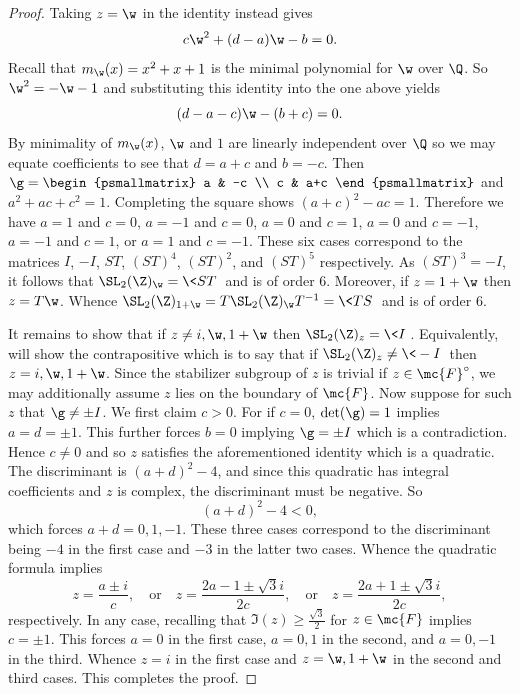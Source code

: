 \documentclass[12pt]{article}
\begin{document}
\begin{proof}
        Taking \(z = \w\) in the identity instead gives
        \[
          c\w^{2}+(d-a)\w-b = 0.
        \]
        Recall that \(m_{\w}(x) = x^{2}+x+1\) is the minimal polynomial for \(\w\) over \(\Q\). So \(\w^{2} = -\w-1\) and substituting this identity into the one above yields
        \[
        (d-a-c)\w-(b+c) = 0.
        \]
        By minimality of \(m_{\w}(x)\), \(\w\) and \(1\) are linearly independent over \(\Q\) so we may equate coefficients to see that \(d = a+c\) and \(b = -c\). Then \(\g = \begin{psmallmatrix} a & -c \\ c & a+c \end{psmallmatrix}\) and \(a^{2}+ac+c^{2} = 1\). Completing the square shows \((a+c)^{2}-ac = 1\). Therefore we have \(a = 1\) and \(c = 0\), \(a = -1\) and \(c = 0\), \(a = 0\) and \(c = 1\), \(a = 0\) and \(c = -1\), \(a = -1\) and \(c = 1\), or \(a = 1\) and \(c = -1\). These six cases correspond to the matrices \(I\), \(-I\), \(ST\), \((ST)^{4}\), \((ST)^{2}\), and \((ST)^{5}\) respectively. As \((ST)^{3} = -I\), it follows that \(\SL_{2}(\Z)_{\w} = \<ST\>\) and is of order \(6\). Moreover, if \(z = 1+\w\) then \(z = T\w\). Whence \(\SL_{2}(\Z)_{1+\w} = T\SL_{2}(\Z)_{\w}T^{-1} = \<TS\>\) and is of order \(6\).
        
        It remains to show that if \(z \neq i,\w,1+\w\) then \(\SL_{2}(\Z)_{z} = \<I\>\). Equivalently, will show the contrapositive which is to say that if \(\SL_{2}(\Z)_{z} \neq \<-I\>\) then \(z = i,\w,1+\w\). Since the stabilizer subgroup of \(z\) is trivial if \(z \in \mc{F}^{\circ}\), we may additionally assume \(z\) lies on the boundary of \(\mc{F}\). Now suppose for such \(z\) that \(\g \neq \pm I\). We first claim \(c > 0\). For if \(c = 0\), \(\det(\g) = 1\) implies \(a = d = \pm1\). This further forces \(b = 0\) implying \(\g = \pm I\) which is a contradiction. Hence \(c \neq 0\) and so \(z\) satisfies the aforementioned identity which is a quadratic. The discriminant is \((a+d)^{2}-4\), and since this quadratic has integral coefficients and \(z\) is complex, the discriminant must be negative. So
        \[
          (a+d)^{2}-4 < 0,
        \]
        which forces \(a+d = 0,1,-1\). These three cases correspond to the discriminant being \(-4\) in the first case and \(-3\) in the latter two cases. Whence the quadratic formula implies
        \[
          z = \frac{a\pm i}{c}, \quad \text{or} \quad z = \frac{2a-1\pm\sqrt{3}i}{2c}, \quad \text{or} \quad z = \frac{2a+1\pm\sqrt{3}i}{2c},
        \]
        respectively. In any case, recalling that \(\Im(z) \ge \frac{\sqrt{3}}{2}\) for \(z \in \mc{F}\) implies \(c = \pm 1\). This forces \(a = 0\) in the first case, \(a = 0,1\) in the second, and \(a = 0,-1\) in the third. Whence \(z = i\) in the first case and \(z = \w,1+\w\) in the second and third cases. This completes the proof.
      \end{proof}
\end{document}
